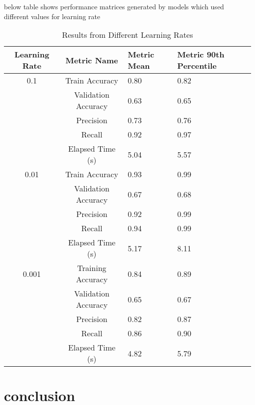 \documentclass{article}
\begin{document}
below table shows performance matrices generated by models which used different values for learning rate 
\begin{table}[h]
\begin{center}
\begin{tabular}{ |c|c|p{1.5cm}|p{2cm}|} 
\hline
Learning Rate & Metric Name & Metric Mean & Metric 90th Percentile\\
\hline
0.1 & Train Accuracy & 0.80 & 0.82\\ 
& Validation Accuracy & 0.63 & 0.65\\ 
& Precision & 0.73 & 0.76 \\ 
& Recall & 0.92 & 0.97 \\ 
& Elapsed Time (s) & 5.04 & 5.57 \\
\hline
0.01 & Train Accuracy & 0.93 & 0.99\\ 
& Validation Accuracy & 0.67 & 0.68\\ 
& Precision & 0.92 & 0.99 \\ 
& Recall & 0.94 & 0.99 \\ 
& Elapsed Time (s) & 5.17 & 8.11 \\
\hline
0.001 & Training Accuracy & 0.84 & 0.89\\ 
& Validation Accuracy & 0.65 & 0.67 \\ 
& Precision & 0.82 & 0.87 \\ 
& Recall & 0.86 & 0.90 \\ 
& Elapsed Time (s) & 4.82 & 5.79 \\
\hline
\end{tabular}
\caption{Results from Different Learning Rates}
\label{tab:results_learn}
\end{center}
\end{table}
\section{conclusion}
\end{document}
